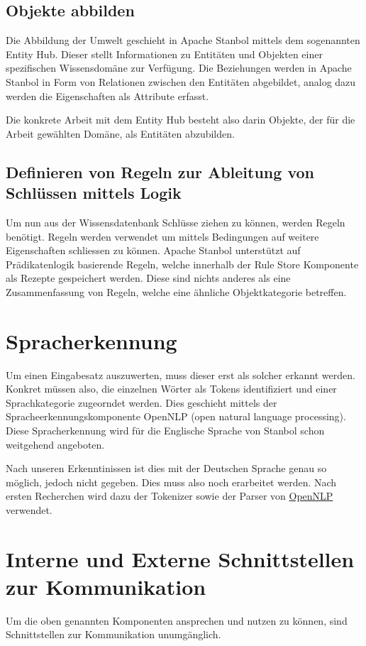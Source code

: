 \subsection{Objekte abbilden}
\label{subsec:architektur_wissensdatenbank_Objekte}
Die Abbildung der Umwelt geschieht in Apache Stanbol mittels dem sogenannten Entity Hub.
Dieser stellt Informationen zu Entitäten und Objekten einer spezifischen Wissensdomäne zur Verfügung. Die Beziehungen werden in Apache Stanbol in Form von Relationen zwischen den Entitäten abgebildet, analog dazu werden die Eigenschaften als Attribute erfasst. 

Die konkrete Arbeit mit dem Entity Hub besteht also darin Objekte, der für die Arbeit gewählten Domäne, als Entitäten abzubilden.

\subsection{Definieren von Regeln zur Ableitung von Schlüssen mittels Logik}
\label{sec:architektur_regeln}
Um nun aus der Wissensdatenbank Schlüsse ziehen zu können, werden Regeln benötigt. Regeln werden verwendet um mittels Bedingungen auf weitere Eigenschaften schliessen zu können.
Apache Stanbol unterstützt auf Prädikatenlogik basierende Regeln, welche innerhalb der Rule Store Komponente als Rezepte gespeichert werden. Diese sind nichts anderes als eine Zusammenfassung von Regeln, welche eine ähnliche Objektkategorie betreffen.

\section{Spracherkennung}
\label{sec:architektur_spracherkennung}
Um einen Eingabesatz auszuwerten, muss dieser erst als solcher erkannt werden. Konkret müssen also, die einzelnen Wörter als Tokens identifiziert und einer Sprachkategorie zugeorndet werden. Dies geschieht mittels der Spracheerkennungskomponente OpenNLP (open natural language processing). Diese Spracherkennung wird für die Englische Sprache von Stanbol schon weitgehend angeboten.

Nach unseren Erkenntinissen ist dies mit der Deutschen Sprache genau so möglich, jedoch nicht gegeben. Dies muss also noch erarbeitet werden. Nach ersten Recherchen wird dazu der Tokenizer sowie der Parser von \href{http://opennlp.sourceforge.net/models-1.5/}{OpenNLP} verwendet.

\section{Interne und Externe Schnittstellen zur Kommunikation}
\label{sec:architektur_schnittstellen}
Um die oben genannten Komponenten ansprechen und nutzen zu können, sind Schnittstellen zur Kommunikation unumgänglich.

